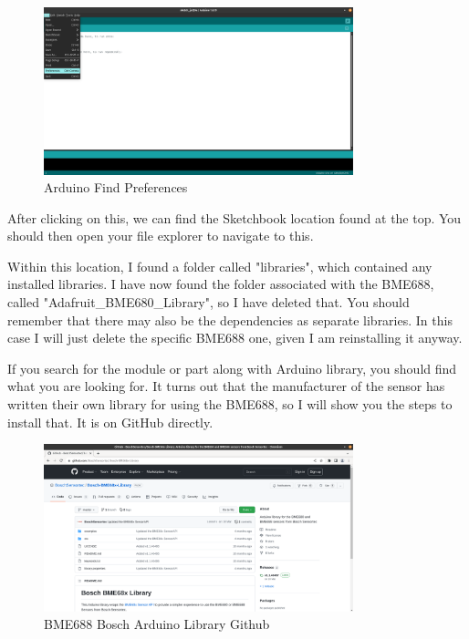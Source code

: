 \documentclass[a4paper,11pt]{report}
\begin{document}
\begin{figure}[H]
\centering
\includegraphics[width=0.8\textwidth]{screenshots/arduinopreferences}
\caption{Arduino Find Preferences}
\end{figure}

After clicking on this, we can find the Sketchbook location found at the top. You should then open your file explorer to navigate to this.

Within this location, I found a folder called "libraries", which contained any installed libraries. I have now found the folder associated with the BME688, called "Adafruit\_BME680\_Library", so I have deleted that. You should remember that there may also be the dependencies as separate libraries. In this case I will just delete the specific BME688 one, given I am reinstalling it anyway.

If you search for the module or part along with Arduino library, you should find what you are looking for. It turns out that the manufacturer of the sensor has written their own library for using the BME688, so I will show you the steps to install that. It is on GitHub directly.

\begin{figure}[H]
\centering
\includegraphics[width=0.8\textwidth]{screenshots/boscharduinolibrarygithub}
\caption{BME688 Bosch Arduino Library Github}
\end{figure}
\end{document}
